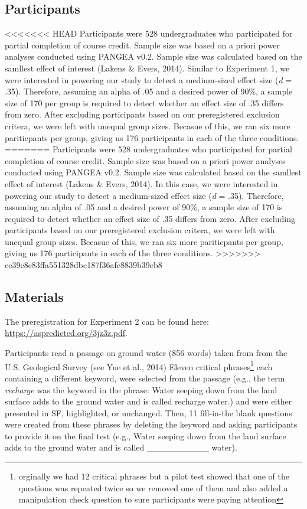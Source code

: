 \documentclass[pdf]{apa6}
\begin{document}
\hypertarget{participants-1}{%
\subsection{Participants}\label{participants-1}}

<<<<<<< HEAD
Participants were 528 undergraduates who participated for partial completion of course credit. Sample size was based on a priori power analyses conducted using PANGEA v0.2. Sample size was calculated based on the samllest effect of interest (Lakens \& Evers, 2014). Similar to Experiment 1, we were interested in powering our study to detect a medium-sized effect size (\emph{d} = .35). Therefore, assuming an alpha of .05 and a desired power of 90\%, a sample size of 170 per group is required to detect whether an effect size of .35 differs from zero. After excluding participants based on our preregistered exclusion critera, we were left with unequal group sizes. Becasue of this, we ran six more pariticpants per group, giving us 176 participants in each of the three conditions.
=======
Participants were 528 undergraduates who participated for partial completion of course credit. Sample size was based on a priori power analyses conducted using PANGEA v0.2. Sample size was calculated based on the samllest effect of interest (Lakens \& Evers, 2014). In this case, we were interested in powering our study to detect a medium-sized effect size (\emph{d} = .35). Therefore, assuming an alpha of .05 and a desired power of 90\%, a sample size of 170 is required to detect whether an effect size of .35 differs from zero. After excluding participants based on our preregistered exclusion critera, we were left with unequal group sizes. Becasue of this, we ran six more pariticpants per group, giving us 176 participants in each of the three conditions.
>>>>>>> cc39c8e83ffa551328dbc187f36afc8839b39eb8

\hypertarget{materials-1}{%
\subsection{Materials}\label{materials-1}}

The preregistration for Experiment 2 can be found here: \url{https://aspredicted.org/3jz3z.pdf}.

Participants read a passage on ground water (856 words) taken from from the U.S. Geological Survey (see Yue et al., 2014) Eleven critical phrases\footnote{orginally we had 12 critical phrases but a pilot test showed that one of the questions was repeated twice so we removed one of them and also added a manipulation check question to sure participants were paying attention} each containing a different keyword, were selected from the passage (e.g., the term \emph{recharge} was the keyword in the phrase: Water seeping down from the land surface adds to the ground water and is called recharge water.) and were either presented in SF, highlighted, or unchanged. Then, 11 fill-in-the blank questions were created from these phrases by deleting the keyword and asking participants to provide it on the final test (e.g., Water seeping down from the land surface adds to the ground water and is called \_\_\_\_\_\_\_\_\_\_ water).
\end{document}
